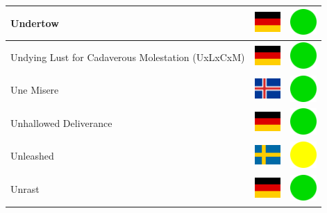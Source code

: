 \documentclass[12pt, a4paper, twoside]{report}
\begin{document}
\begin{center}
\begin{longtable}{|p{5cm}|p{2cm}|p{2cm}|}
 Undertow                                                   & \includegraphics[width=1cm]{../img/flags/de} &   \includegraphics[width=1cm]{../likes/y} \\ \hline
 Undying Lust for Cadaverous Molestation (UxLxCxM)          & \includegraphics[width=1cm]{../img/flags/de} &   \includegraphics[width=1cm]{../likes/y} \\ \hline
 Une Misere                                                 & \includegraphics[width=1cm]{../img/flags/is} &   \includegraphics[width=1cm]{../likes/y} \\ \hline
 Unhallowed Deliverance                                     & \includegraphics[width=1cm]{../img/flags/de} &   \includegraphics[width=1cm]{../likes/y} \\ \hline
 Unleashed                                                  & \includegraphics[width=1cm]{../img/flags/se} &   \includegraphics[width=1cm]{../likes/m} \\ \hline
 Unrast                                                     & \includegraphics[width=1cm]{../img/flags/de} &   \includegraphics[width=1cm]{../likes/y} \\ \hline

\end{longtable}
\end{center}
\end{document}

